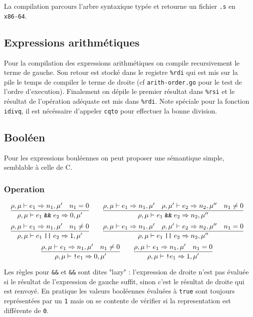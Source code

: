 \documentclass[9pt,a4paper]{article}
\begin{document}
La compilation parcours l'arbre syntaxique typée et retourne un fichier \verb|.s| en \verb|x86-64|.

\subsection{Expressions arithmétiques}

Pour la compilation des expressions arithmétiques on compile recursivement le terme de gauche. Son retour est stocké dans le registre \verb|%rdi| qui est mis sur la pile le temps de compiler le terme de droite (cf \verb|arith-order.go| pour le test de l'ordre d'execution). Finalement on dépile le premier résultat dans \verb|%rsi| et le résultat de l'opération adéquate est mis dans \verb|%rdi|.
Note spéciale pour la fonction \verb|idivq|, il est nécéssaire d'appeler \verb|cqto| pour effectuer la bonne division.

\subsection{Booléen}

Pour les expressions bouléennes on peut proposer une sémantique simple, semblable à celle de C.

\subsubsection*{Operation}
\vspace{-1em}

$$\infer{\rho, \mu \vdash e_1 \; \text{\texttt{\&\&}} \; e_2 \Rightarrow 0, \mu '}{\rho, \mu \vdash e_1 \Rightarrow n_1, \mu ' & n_1 = 0}
\; \text{\; \; \;} \;
\infer{\rho, \mu \vdash e_1 \; \text{\texttt{\&\&}} \; e_2 \Rightarrow n_2, \mu ''}{\rho, \mu \vdash e_1 \Rightarrow n_1, \mu ' & \rho, \mu ' \vdash e_2 \Rightarrow n_2, \mu '' & n_1 \neq 0}$$
$$\infer{\rho, \mu \vdash e_1 \; \text{\texttt{||}} \; e_2 \Rightarrow 1, \mu '}{\rho, \mu \vdash e_1 \Rightarrow n_1, \mu ' & n_1 \neq 0}
\; \text{\; \; \;} \;
\infer{\rho, \mu \vdash e_1 \; \text{\texttt{||}} \; e_2 \Rightarrow n_2, \mu ''}{\rho, \mu \vdash e_1 \Rightarrow n_1, \mu ' & \rho, \mu ' \vdash e_2 \Rightarrow n_2, \mu '' & n_1 = 0}$$
$$\infer{\rho, \mu \vdash \text{\texttt{!}} e_1 \Rightarrow 0, \mu '}{\rho, \mu \vdash e_1 \Rightarrow n_1, \mu ' & n_1 \neq 0}
\; \text{\; \; \;} \;
\infer{\rho, \mu \vdash \text{\texttt{!}} e_1 \Rightarrow 1, \mu '}{\rho, \mu \vdash e_1 \Rightarrow n_1, \mu ' & n_1 = 0}$$

Les règles pour \verb-&&- et \verb-&&- sont dites "lazy" : l'expression de droite n'est pas évaluée si le résultat de l'expression de gauche suffit, sinon c'est le résultat de droite qui est renvoyé.
En pratique les valeurs booléennes évaluées à \verb|true| sont toujours représentées par un \verb|1| mais on se contente de vérifier si la representation est différente de \verb|0|.
\end{document}
